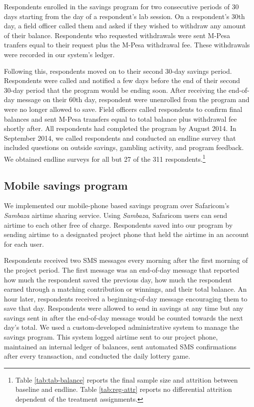 \documentclass[10pt]{article}
\begin{document}
 	Respondents enrolled in the savings program for two consecutive periods of 30 days starting from the day of a respondent’s lab session. On a respondent’s 30th day, a field officer called them and asked if they wished to withdraw any amount of their balance. Respondents who requested withdrawals were sent M-Pesa tranfers equal to their request plus the M-Pesa withdrawal fee. These withdrawals were recorded in our system’s ledger.

	Following this, respondents moved on to their second 30-day savings period. Respondents were called and notified a few days before the end of their second 30-day period that the program would be ending soon. After receiving the end-of-day message on their 60th day, respondent were unenrolled from the program and were no longer allowed to save. Field officers called respondents to confirm final balances and sent M-Pesa transfers equal to total balance plus withdrawal fee shortly after. All respondents had completed the program by August 2014. In September 2014, we called respondents and conducted an endline survey that included questions on outside savings, gambling activity, and program feedback. We obtained endline surveys for all but 27 of the 311 respondents.\footnote{Table \ref{tab:tab-balance} reports the final sample size and attrition between baseline and endline. Table \ref{tab:reg-attr} reports no differential attrition dependent of the treatment assignments.}

	\subsection{Mobile savings program}

		We implemented our mobile-phone based savings program over Safaricom's \textit{Sambaza} airtime sharing service. Using \textit{Sambaza}, Safaricom users can send airtime to each other free of charge. Respondents saved into our program by sending airtime to a designated project phone that held the airtime in an account for each user.

		Respondents received two SMS messages every morning after the first morning of the project period. The first message was an end-of-day message that reported how much the respondent saved the previous day, how much the respondent earned through a matching contribution or winnings, and their total balance. An hour later, respondents received a beginning-of-day message encouraging them to save that day. Respondents were allowed to send in savings at any time but any savings sent in after the end-of-day message would be counted towards the next day’s total. We used a custom-developed administrative system to manage the savings program. This system logged airtime sent to our project phone, maintained an internal ledger of balances, sent automated SMS confirmations after every transaction, and conducted the daily lottery game.
\end{document}
